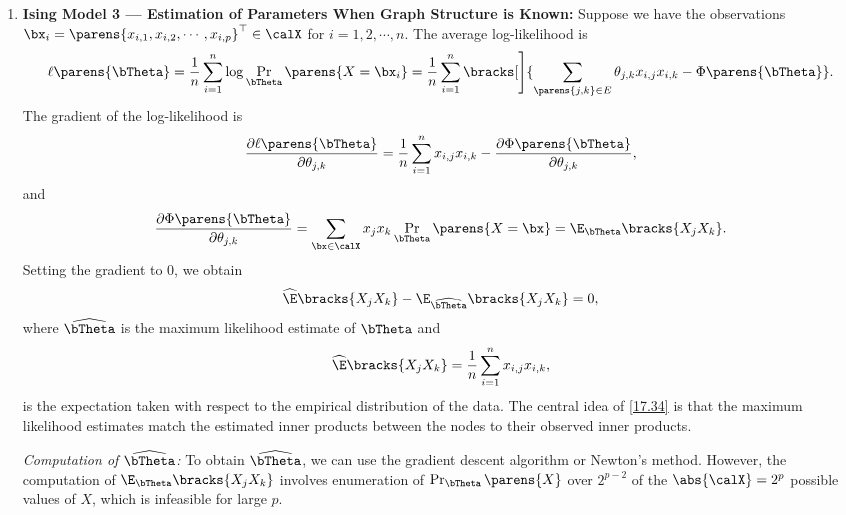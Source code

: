 \documentclass[12pt]{article}
\begin{document}
\begin{enumerate}[label=\textbf{\arabic*.}]
	\item \textbf{Ising Model 3 --- Estimation of Parameters When Graph Structure is Known:} Suppose we have the observations $\bx_i = \parens{x_{i,1}, x_{i,2}, \cdots, x_{i,p}}^\top \in \calX$ for $i = 1, 2, \cdots, n$. The average log-likelihood is 
	\begin{align}
		\ell \parens{\bTheta} = \frac{1}{n} \sum_{i=1}^n \log \Pr_{\bTheta} \parens{X = \bx_i} = \frac{1}{n} \sum_{i=1}^n \bracks[\Bigg]{\sum_{\parens{j, k} \in E} \theta_{j,k} x_{i,j} x_{i, k} - \Phi \parens{\bTheta}}. 
	\end{align}
	The gradient of the log-likelihood is 
	\begin{align*}
		\frac{\partial \ell \parens{\bTheta}}{\partial \theta_{j,k}} = \frac{1}{n} \sum_{i=1}^n x_{i,j} x_{i,k} - \frac{\partial \Phi \parens{\bTheta}}{\partial \theta_{j,k}}, 
	\end{align*}
	and 
	\begin{align*}
		\frac{\partial \Phi \parens{\bTheta}}{\partial \theta_{j,k}} = \sum_{\bx \in \calX} x_j x_k \Pr_{\bTheta} \parens{X = \bx} = \E_{\bTheta}\bracks{X_j X_k}. 
	\end{align*}
	Setting the gradient to 0, we obtain 
	\begin{align}\label{17.34}
		\widehat{\E} \bracks{X_j X_k} - \E_{\widehat{\bTheta}} \bracks{X_j X_k} = 0, 
	\end{align}
	where $\widehat{\bTheta}$ is the maximum likelihood estimate of $\bTheta$ and 
	\begin{align*}
		\widehat{\E} \bracks{X_j X_k} = \frac{1}{n} \sum_{i=1}^n x_{i,j} x_{i,k},  
	\end{align*}
	is the expectation taken with respect to the empirical distribution of the data. The central idea of \eqref{17.34} is that the maximum likelihood estimates match the estimated inner products between the nodes to their observed inner products. 
	
	\textit{Computation of $\widehat{\bTheta}$:} To obtain $\widehat{\bTheta}$, we can use the gradient descent algorithm or Newton's method. However, the computation of $\E_{\bTheta} \bracks{X_j X_k}$ involves enumeration of $\Pr_{\bTheta} \parens{X}$ over $2^{p-2}$ of the $\abs{\calX} = 2^p$ possible values of $X$, which is infeasible for large $p$. %
	

\end{enumerate}
\end{document}
